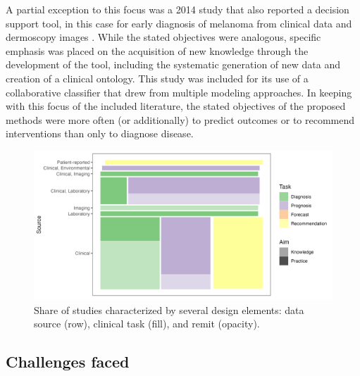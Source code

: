 \documentclass[sn-mathphys,Numbered,pdflatex]{sn-jnl}
\theoremstyle{remark}
\theoremstyle{definition}
\newcommand{\hl}[1]{#1}
\begin{document}
A partial exception to this focus was a 2014 study that also reported a
decision support tool, in this case for early diagnosis of melanoma from
clinical data and dermoscopy images \citep{Nicolas2014}. While the
stated objectives were analogous, specific emphasis was placed on the
acquisition of new knowledge through the development of the tool,
including the systematic generation of new data and creation of a
clinical ontology. This study was included for its use of a
collaborative classifier that drew from multiple modeling approaches. In
keeping with this focus of the included literature, the stated
objectives of the proposed methods were more often (or additionally) to
predict outcomes or to recommend interventions than only to diagnose
disease.

\begin{figure}

{\centering \includegraphics[width=1\linewidth]{Fig3} 

}

\caption{\hl{Share of studies characterized by several design elements:}
 data source (row),
 clinical task (fill), and
 remit (opacity).}\label{fig:properties}
\end{figure}

\subsection{\texorpdfstring{Challenges\hl{ faced}}{Challenges}}\label{challenges}
\end{document}
